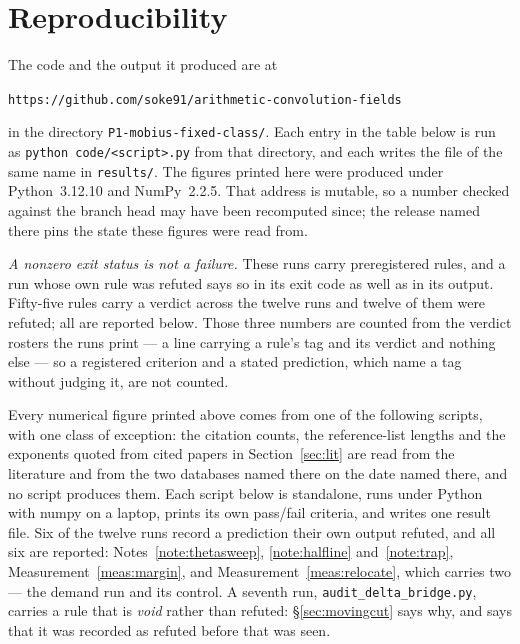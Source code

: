\documentclass[11pt,a4paper]{article}
\theoremstyle{plain}
\theoremstyle{definition}
\theoremstyle{remark}
\begin{document}
\section{Reproducibility}\label{sec:repro}

The code and the output it produced are at

\begin{center}
\texttt{https://github.com/soke91/arithmetic-convolution-fields}
\end{center}

\noindent in the directory \texttt{P1-mobius-fixed-class/}. Each entry
in the table below is run as \texttt{python code/<script>.py} from that
directory, and each writes the file of the same name in
\texttt{results/}. The figures printed here were produced under
Python~3.12.10 and NumPy~2.2.5. That address is mutable, so a number
checked against the branch head may have been recomputed since; the
release named there pins the state these figures were read from.

\emph{A nonzero exit status is not a failure.} These runs carry
preregistered rules, and a run whose own rule was refuted says so in
its exit code as well as in its output. Fifty-five rules carry a
verdict across the twelve runs and twelve of them were refuted; all
are reported below. Those three numbers are counted from the verdict
rosters the runs print --- a line carrying a rule's tag and its verdict
and nothing else --- so a registered criterion and a stated prediction,
which name a tag without judging it, are not counted.

Every numerical figure printed above comes from one of the following
scripts, with one class of exception: the citation counts, the
reference-list lengths and the exponents quoted from cited papers in
Section~\ref{sec:lit} are read from the literature and from the two
databases named there on the date named there, and no script produces
them. Each script below is standalone, runs under Python with numpy on
a laptop, prints its own pass/fail criteria, and writes one result
file. Six of the twelve runs record a prediction their own output
refuted, and all six are reported:
Notes~\ref{note:thetasweep}, \ref{note:halfline} and~\ref{note:trap},
Measurement~\ref{meas:margin}, and Measurement~\ref{meas:relocate},
which carries two --- the demand run and its control. A seventh run,
\texttt{audit\_delta\_bridge.py}, carries a rule that is \emph{void}
rather than refuted: \S\ref{sec:movingcut} says why, and says that it
was recorded as refuted before that was seen.
\end{document}
